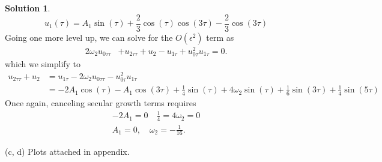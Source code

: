 \documentclass[12pt]{article}
\theoremstyle{definition}
\newtheorem{sol}{Solution}
\theoremstyle{remark}
\begin{document}
\begin{sol}
\begin{equation*}
    u_{1}(\tau) = A_{1} \sin( \tau ) + \frac{2}{3} \cos(\tau)\cos(3\tau) - \frac{2}{3} \cos(3 \tau)
\end{equation*}
    Going one more level up, we can solve for the $O(\epsilon^{2})$ term as
    \begin{align*}
        2 \omega_{2} u_{0 \tau \tau} &+ u_{2 \tau \tau} + u_{2} - u_{1 \tau} + u_{0 \tau}^{2} u_{1 \tau} = 0.
    \end{align*}
    which we simplify to 
    \begin{align*}
        u_{2 \tau \tau} + u_{2} &= u_{1 \tau} - 2 \omega_{2} u_{0 \tau \tau} - u_{0 \tau}^{2} u_{1 \tau}\\
                                &= - 2 A_{1} \cos( \tau ) - A_{1} \cos(3 \tau) + \frac{1}{4} \sin(\tau) + 4  \omega_{2} \sin( \tau ) + \frac{1}{6} \sin(3 \tau) + \frac{1}{4} \sin(5 \tau)    
    \end{align*}
    Once again, canceling secular growth terms requires
    \begin{align*}
    -2 A_{1} = 0 \quad  \frac{1}{4} = 4 \omega_{2} = 0\\
    A_{1} = 0, \quad \omega_{2} = -\frac{1}{16}.
    \end{align*}

    (c, d) Plots attached in appendix.
\end{sol}
\end{document}

